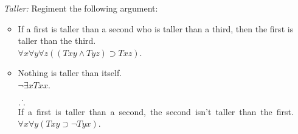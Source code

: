 \documentclass[a4paper, 11pt]{article} %
\newcommand{\tuple}[1]{\langle#1\rangle} %
\def\therefore{\ensuremath{\ldotp\dot\,\ldotp}}
\newcommand{\I}{\mathcal{I}}
\newcommand{\VV}[2]{\mathcal{V}_{#1}^{#2}} %
\begin{document}
\begin{enumerate}
  \item[\it Taller:] Regiment the following argument:
    \begin{itemize}
      \item If a first is taller than a second who is taller than a third, then the first is taller than the third.\\
        $\forall x\forall y\forall z((Txy \wedge Tyz) \supset Txz)$.
      \item Nothing is taller than itself.\\
        $\neg\exists xTxx$.
      \item[\therefore] \mbox{If a first is taller than a second, the second isn't taller than the first.}\\
        $\forall x\forall y(Txy \supset \neg Tyx)$.
    \end{itemize}
\end{enumerate}
\end{document}
